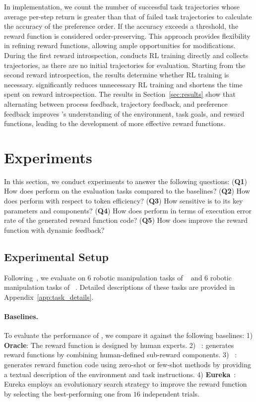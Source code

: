\documentclass{article}
\theoremstyle{plain}
\theoremstyle{definition}
\theoremstyle{remark}
\begin{document}
In implementation, we count the number of successful task trajectories whose average per-step return is greater than that of failed task trajectories to calculate the accuracy of the preference order. If the accuracy exceeds a threshold, the reward function is considered order-preserving. This approach provides flexibility in refining reward functions, allowing ample opportunities for modifications. During the first reward introspection, \critic conducts RL training directly and collects trajectories, as there are no initial trajectories for \TPE evaluation. Starting from the second reward introspection, the \TPE results determine whether RL training is necessary. \TPE significantly reduces unnecessary RL training and shortens the time spent on reward introspection. The results in Section~\ref{sec:results} show that alternating between process feedback, trajectory feedback, and preference feedback improves \designer's understanding of the environment, task goals, and reward functions, leading to the development of more effective reward functions.


\section{Experiments}\label{sec:experiments}

In this section, we conduct experiments to answer the following questions:
(\textbf{Q1}) How does \ourmethod perform on the evaluation tasks compared to the baselines?
(\textbf{Q2}) How does \ourmethod perform with respect to token efficiency?
(\textbf{Q3}) How sensitive is \ourmethod to its key parameters and components?
(\textbf{Q4}) How does \ourmethod perform in terms of execution error rate of the generated reward function code?
(\textbf{Q5}) How does \ourmethod improve the reward function with dynamic feedback?


\subsection{Experimental Setup}\label{sec:experimental_setup}

Following~\cite{Text2Reward}, we evaluate on $6$ robotic manipulation tasks of \MW~\cite{Meta-World} and $6$ robotic manipulation tasks of \MS~\cite{ManiSkill2}. Detailed descriptions of these tasks are provided in Appendix~\ref{app:task_details}.

\paragraph{Baselines.}
To evaluate the performance of \ourmethod, we compare it against the following baselines:
1) \textbf{Oracle}: The reward function is designed by human experts.
2) \textbf{\lr}~\cite{L2R}: \lr generates reward functions by combining human-defined sub-reward components.
3) \textbf{\tr}~\cite{Text2Reward}: \tr generates reward function code using zero-shot or few-shot methods by providing a textual description of the environment and task instructions.
4) \textbf{Eureka}~\cite{Eureka}: Eureka employs an evolutionary search strategy to improve the reward function by selecting the best-performing one from $16$ independent trials.
\end{document}
